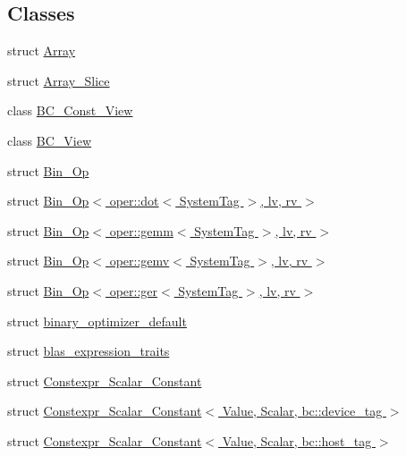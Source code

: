 \subsection*{Classes}
\begin{DoxyCompactItemize}
\item 
struct \hyperlink{structbc_1_1tensors_1_1exprs_1_1Array}{Array}
\item 
struct \hyperlink{classbc_1_1tensors_1_1exprs_1_1Array__Slice}{Array\+\_\+\+Slice}
\item 
class \hyperlink{classbc_1_1tensors_1_1exprs_1_1BC__Const__View}{B\+C\+\_\+\+Const\+\_\+\+View}
\item 
class \hyperlink{classbc_1_1tensors_1_1exprs_1_1BC__View}{B\+C\+\_\+\+View}
\item 
struct \hyperlink{structbc_1_1tensors_1_1exprs_1_1Bin__Op}{Bin\+\_\+\+Op}
\item 
struct \hyperlink{structbc_1_1tensors_1_1exprs_1_1Bin__Op_3_01oper_1_1dot_3_01SystemTag_01_4_00_01lv_00_01rv_01_4}{Bin\+\_\+\+Op$<$ oper\+::dot$<$ System\+Tag $>$, lv, rv $>$}
\item 
struct \hyperlink{structbc_1_1tensors_1_1exprs_1_1Bin__Op_3_01oper_1_1gemm_3_01SystemTag_01_4_00_01lv_00_01rv_01_4}{Bin\+\_\+\+Op$<$ oper\+::gemm$<$ System\+Tag $>$, lv, rv $>$}
\item 
struct \hyperlink{structbc_1_1tensors_1_1exprs_1_1Bin__Op_3_01oper_1_1gemv_3_01SystemTag_01_4_00_01lv_00_01rv_01_4}{Bin\+\_\+\+Op$<$ oper\+::gemv$<$ System\+Tag $>$, lv, rv $>$}
\item 
struct \hyperlink{structbc_1_1tensors_1_1exprs_1_1Bin__Op_3_01oper_1_1ger_3_01SystemTag_01_4_00_01lv_00_01rv_01_4}{Bin\+\_\+\+Op$<$ oper\+::ger$<$ System\+Tag $>$, lv, rv $>$}
\item 
struct \hyperlink{structbc_1_1tensors_1_1exprs_1_1binary__optimizer__default}{binary\+\_\+optimizer\+\_\+default}
\item 
struct \hyperlink{structbc_1_1tensors_1_1exprs_1_1blas__expression__traits}{blas\+\_\+expression\+\_\+traits}
\item 
struct \hyperlink{structbc_1_1tensors_1_1exprs_1_1Constexpr__Scalar__Constant}{Constexpr\+\_\+\+Scalar\+\_\+\+Constant}
\item 
struct \hyperlink{structbc_1_1tensors_1_1exprs_1_1Constexpr__Scalar__Constant_3_01Value_00_01Scalar_00_01bc_1_1device__tag_01_4}{Constexpr\+\_\+\+Scalar\+\_\+\+Constant$<$ Value, Scalar, bc\+::device\+\_\+tag $>$}
\item 
struct \hyperlink{structbc_1_1tensors_1_1exprs_1_1Constexpr__Scalar__Constant_3_01Value_00_01Scalar_00_01bc_1_1host__tag_01_4}{Constexpr\+\_\+\+Scalar\+\_\+\+Constant$<$ Value, Scalar, bc\+::host\+\_\+tag $>$}

\end{DoxyCompactItemize}
